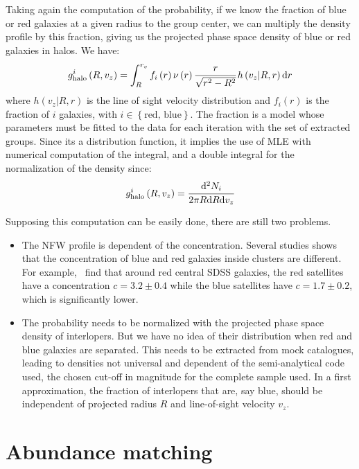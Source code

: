 Taking again the computation of the probability, if we know the fraction of
blue or red galaxies at a given radius to the group center, we can multiply the
density profile by this fraction, giving us the projected phase space density
of blue or red galaxies in halos. We have:
%
\begin{equation}
    g_\mathrm{halo}^i\left(R, v_z\right)=
    \int_R^{r_v} f_i\left(r\right) \nu\left(r\right)
    \cfrac{r}{\sqrt{r^2-R^2}} \,h\left(v_z|R,r\right) {\rm{d}} r
\end{equation}
%
where $h\left(v_z|R,r\right)$ is the line of sight velocity distribution and
$f_i\left(r\right)$ is the fraction of $i$ galaxies, with
$i\in\left\{\mbox{red, blue}\right\}$. The fraction is a model whose parameters
must be fitted to the data for each iteration with the set of extracted groups.
Since its a distribution function, it implies the use of MLE with numerical
computation of the integral, and a double integral for the normalization of the
density since:
%
\begin{equation}
    g_\mathrm{halo}^i\left(R, v_z\right) = \cfrac{{\rm{d}}^2N_i}{2\pi R{\rm{d}} R{\rm{d}} v_z}
\end{equation}

Supposing this computation can be easily done, there are still two problems.
%
\begin{itemize}
    \item The NFW profile is dependent of the concentration. Several studies
        shows that the concentration of blue and red galaxies inside clusters
        are different. For example,~\cite{Guo+12} find that around red central
        SDSS galaxies, the red satellites have a concentration $c=3.2\pm0.4$
        while the blue satellites have $c=1.7\pm0.2$, which is significantly
        lower.
    \item The probability needs to be normalized with the projected phase space
        density of interlopers. But we have no idea of their distribution when
        red and blue galaxies are separated. This needs to be extracted from
        mock catalogues, leading to densities not universal and dependent of
        the semi-analytical code used, the chosen cut-off in magnitude for the
        complete sample used. In a first approximation, the fraction of
        interlopers that are, say blue, should be independent of projected
        radius $R$ and line-of-sight velocity $v_z$.
\end{itemize}

\section{Abundance matching}
\label{sec:abundance_matching}

